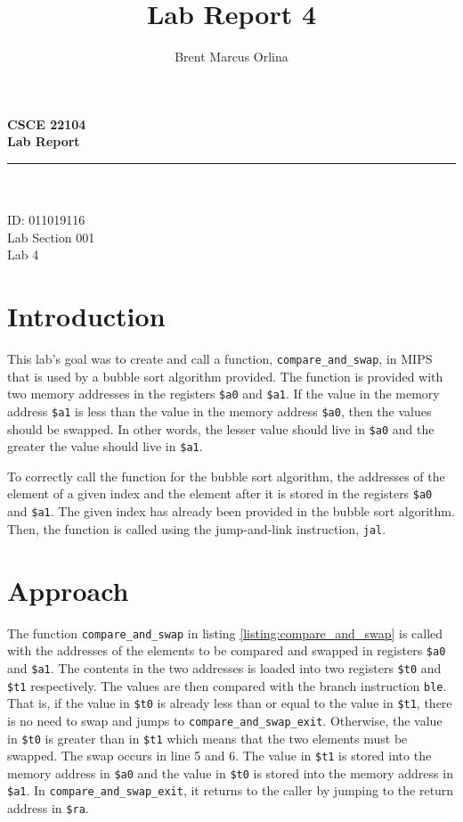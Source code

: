 \documentclass[11pt]{report}
\makeatletter
\newcommand{\@labsection}{000}
\newcommand{\labsection}[1]{
    \renewcommand{\@labsection}{#1}
}
\newcommand{\@labnumber}{0}
\newcommand{\labnumber}[1]{
    \renewcommand{\@labnumber}{#1}
}
\newcommand{\@shortsubmitted}{1/1/70}
\newcommand{\shortsubmitted}[1]{
    \renewcommand{\@shortsubmitted}{#1}
}
\renewcommand{\maketitle}{
    \newgeometry{left=1in, right=1in, top=1.75in, textheight=8.25in}
    \singlespacing
    \begin{center}
        {\huge \bf CSCE 22104} \\
        \vspace{2.5em}
        {\Large \bf Lab Report} \\
        \vspace{2em}
        \noindent\rule{20em}{0.4pt} \\
        \vspace{1em}
        {\Large \@author} \\
        \vspace{.75em}
        {\normalsize ID: 011019116} \\
        \vspace{.75em}
        {\normalsize Lab Section \@labsection} \\
        \vspace{.75em}
        {\normalsize Lab \@labnumber} \\
    \end{center}
    \newpage
    \restoregeometry
}
\makeatother
\begin{document}
\title{Lab Report 4}
\author{Brent Marcus Orlina}

\labsection{001}
\labnumber{4}

\shortsubmitted{2/5/25}

\maketitle

\section*{Introduction}
This lab's goal was to create and call a function, \verb|compare_and_swap|, in MIPS that is used by
a bubble sort algorithm provided. The function is provided with two memory addresses in the
registers \verb|$a0| and \verb|$a1|. If the value in the memory address \verb|$a1| is less than the
value in the memory address \verb|$a0|, then the values should be swapped. In other words, the lesser
value should live in \verb|$a0| and the greater the value should live in \verb|$a1|.

To correctly call the function for the bubble sort algorithm, the addresses of the element of a
given index and the element after it is stored in the registers \verb|$a0| and \verb|$a1|. The given
index has already been provided in the bubble sort algorithm. Then, the function is called using the
jump-and-link instruction, \verb|jal|. 

\newpage

\section*{Approach}

The function \verb|compare_and_swap| in listing \ref{listing:compare_and_swap} is called with the
addresses of the elements to be compared and swapped in registers \verb|$a0| and \verb|$a1|. The
contents in the two addresses is loaded into two registers \verb|$t0| and \verb|$t1| respectively.
The values are then compared with the branch instruction \verb|ble|. That is, if the value in
\verb|$t0| is already less than or equal to the value in \verb|$t1|, there is no need to swap and
jumps to \verb|compare_and_swap_exit|. Otherwise, the value in \verb|$t0| is greater than in
\verb|$t1| which means that the two elements must be swapped. The swap occurs in line 5 and 6. The
value in \verb|$t1| is stored into the memory address in \verb|$a0| and the value in \verb|$t0| is
stored into the memory address in \verb|$a1|. In \verb|compare_and_swap_exit|, it returns to the
caller by jumping to the return address in \verb|$ra|.
\end{document}
